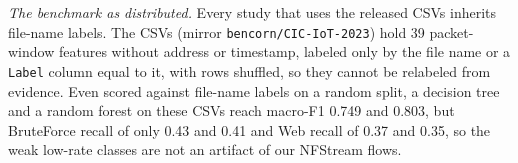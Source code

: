 \emph{The benchmark as distributed.} Every study that uses the released CSVs inherits file-name labels. The CSVs (mirror \texttt{bencorn/CIC-IoT-2023}) hold 39 packet-window features without address or timestamp, labeled only by the file name or a \texttt{Label} column equal to it, with rows shuffled, so they cannot be relabeled from evidence. Even scored against file-name labels on a random split, a decision tree and a random forest on these CSVs reach macro-F1 0.749 and 0.803, but BruteForce recall of only 0.43 and 0.41 and Web recall of 0.37 and 0.35, so the weak low-rate classes are not an artifact of our NFStream flows.
